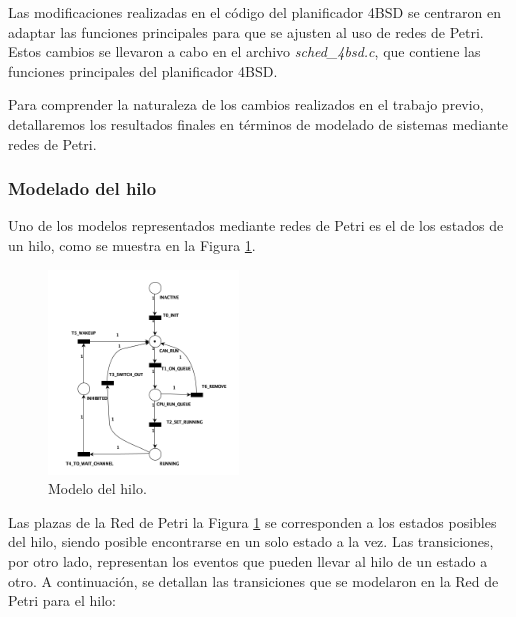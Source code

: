 Las modificaciones realizadas en el código del planificador 4BSD se centraron en adaptar las funciones principales para que se ajusten al uso de redes de Petri. Estos cambios se llevaron a cabo en el archivo \textit{sched\_4bsd.c}, que contiene las funciones principales del planificador 4BSD.

Para comprender la naturaleza de los cambios realizados en el trabajo previo, detallaremos los resultados finales en términos de modelado de sistemas mediante redes de Petri.

\subsubsection{Modelado del hilo}

Uno de los modelos representados mediante redes de Petri es el de los estados de un hilo, como se muestra en la Figura \ref{fig:threadModel}.\par

\begin{figure}[H]
    \centering
    \includegraphics[width=0.45\textwidth]{images/Thread_Net.png}
    \caption{Modelo del hilo.}
    \label{fig:threadModel}
\end{figure}

Las plazas de la Red de Petri la Figura \ref{fig:threadModel} se corresponden a los estados posibles del hilo, siendo posible encontrarse en un solo estado a la vez. Las transiciones, por otro lado, representan los eventos que pueden llevar al hilo de un estado a otro. A continuación, se detallan las transiciones que se modelaron en la Red de Petri para el hilo:

